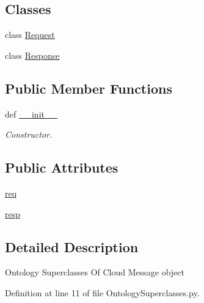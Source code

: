 \subsection*{Classes}
\begin{DoxyCompactItemize}
\item 
class \hyperlink{classRappCloud_1_1CloudMsgs_1_1OntologySuperclasses_1_1OntologySuperclasses_1_1Request}{Request}
\item 
class \hyperlink{classRappCloud_1_1CloudMsgs_1_1OntologySuperclasses_1_1OntologySuperclasses_1_1Response}{Response}
\end{DoxyCompactItemize}
\subsection*{Public Member Functions}
\begin{DoxyCompactItemize}
\item 
def \hyperlink{classRappCloud_1_1CloudMsgs_1_1OntologySuperclasses_1_1OntologySuperclasses_a1054b938a742f8a907f18083dd37a44e}{\-\_\-\-\_\-init\-\_\-\-\_\-}
\begin{DoxyCompactList}\small\item\em Constructor. \end{DoxyCompactList}\end{DoxyCompactItemize}
\subsection*{Public Attributes}
\begin{DoxyCompactItemize}
\item 
\hyperlink{classRappCloud_1_1CloudMsgs_1_1OntologySuperclasses_1_1OntologySuperclasses_a0eb36691dc7e63744c51536105da473e}{req}
\item 
\hyperlink{classRappCloud_1_1CloudMsgs_1_1OntologySuperclasses_1_1OntologySuperclasses_a2db9653ccbfa28da8eca4e46366de88e}{resp}
\end{DoxyCompactItemize}


\subsection{Detailed Description}
\begin{DoxyVerb}Ontology Superclasses Of Cloud Message object\end{DoxyVerb}
 

Definition at line 11 of file Ontology\-Superclasses.\-py.



